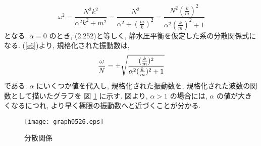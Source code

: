 \documentclass[a4j,12pt,openbib,oneside,dvipdfmx]{jsbook}
\def\thefigure{\arabic{chapter}.\arabic{section}.\arabic{figure}}
\begin{document}
\begin{equation}
  {\omega}^2={\frac{N^2k^2}{{\alpha}^2k^2+m^2}}={\frac{N^2}{{\alpha}^2+({\frac{m}{k}})^2}}={\frac{N^2({\frac{k}{m}})^2}{{\alpha}^2({\frac{k}{m}})^2+1}}
  \label{e6}
\end{equation}
となる. ${\alpha}=0$ のとき, (2.252)と等しく, 静水圧平衡を仮定した系の分散関係式になる. (\ref{e6})より, 規格化された振動数は, 
\begin{equation}
  \frac{\omega}{N}=\pm{\sqrt {\mathstrut {\frac{({\frac{k}{m}})^2}{{\alpha}^2({\frac{k}{m}})^2+1}}}}
\end{equation}
である. ${\alpha}$ にいくつか値を代入し, 規格化された振動数を, 規格化された波数の関数として描いたグラフを 図 \ref{graph} に示す. 図より, ${\alpha}>1$ の場合には, ${\alpha}$ の値が大きくなるにつれ, より早く極限の振動数へと近づくことが分かる.\\

\def\thefigure{\arabic{figure}}
\begin{figure}[!h]
  \centering
  \texttt{[image: graph0526.eps]}
  \caption{分散関係} \label{graph}
\end{figure}

\newpage
\appendix
\end{document}
